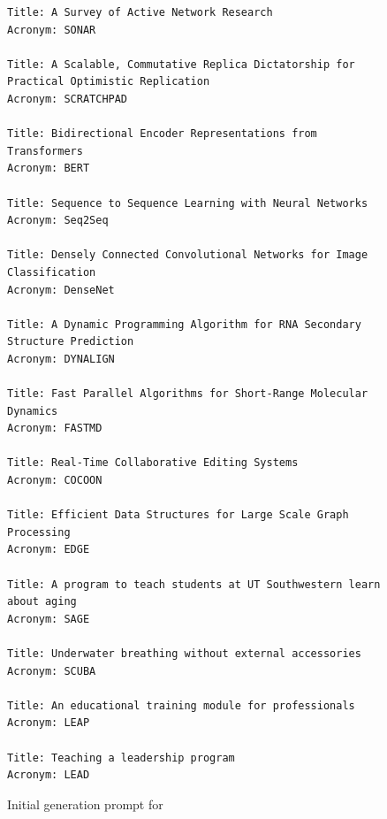 \begin{figure}

\begin{small}
    \captionsetup{justification=centering, labelfont=bf, font=small}
    \begin{verbatim}
Title: A Survey of Active Network Research
Acronym: SONAR

Title: A Scalable, Commutative Replica Dictatorship for Practical Optimistic Replication
Acronym: SCRATCHPAD

Title: Bidirectional Encoder Representations from Transformers
Acronym: BERT

Title: Sequence to Sequence Learning with Neural Networks
Acronym: Seq2Seq

Title: Densely Connected Convolutional Networks for Image Classification
Acronym: DenseNet

Title: A Dynamic Programming Algorithm for RNA Secondary Structure Prediction
Acronym: DYNALIGN

Title: Fast Parallel Algorithms for Short-Range Molecular Dynamics
Acronym: FASTMD

Title: Real-Time Collaborative Editing Systems
Acronym: COCOON

Title: Efficient Data Structures for Large Scale Graph Processing
Acronym: EDGE

Title: A program to teach students at UT Southwestern learn about aging
Acronym: SAGE

Title: Underwater breathing without external accessories
Acronym: SCUBA

Title: An educational training module for professionals
Acronym: LEAP

Title: Teaching a leadership program
Acronym: LEAD
\end{verbatim}

\end{small}
\caption{Initial generation prompt for \acrogen}
    \label{fig:prompt:acronym:init}
\end{figure}